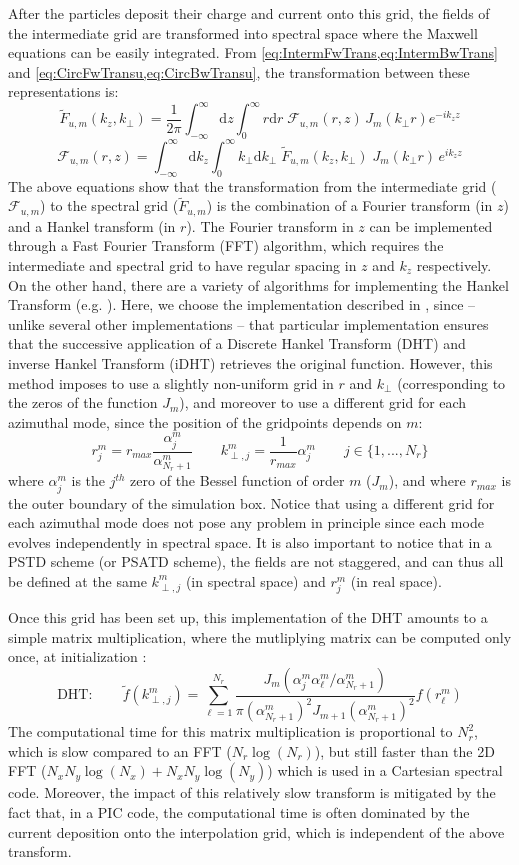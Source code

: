 \documentclass[a4paper]{article}   	%
\newcommand{\Integ}[1]{\int_{-\infty}^{\infty} \!\!\!\!\!
  \mathrm{d}#1}
\newcommand{\RInteg}[1]{\int_{0}^{\infty} \!\!\!\!\! #1\mathrm{d}#1}
\begin{document}
After the particles deposit their charge and current onto this grid,
the fields of the intermediate grid are transformed into spectral
space where the Maxwell equations can be easily integrated. From
\cref{eq:IntermFwTrans,eq:IntermBwTrans} and
\cref{eq:CircFwTransu,eq:CircBwTransu}, the transformation between these
representations is:
\[ \tilde{F}_{u,m}(k_z,k_\perp) =  \frac{1}{2\pi} \Integ{z} \RInteg{r} \;
\mathcal{F}_{u,m}(r,z) \, J_m(k_\perp r) e^{- ik_z z} \]
\[ \mathcal{F}_{u,m}(r,z) = \Integ{k_z}
\RInteg{k_\perp }\; \tilde{F}_{u,m}(k_z,k_\perp ) \; J_m(k_\perp r)\, e^{ik_z z}   \]
The above equations show that the transformation from the intermediate
grid ($\mathcal{F}_{u,m}$) to the spectral grid ($\tilde{F}_{u,m}$) is
the combination of a Fourier transform (in $z$) and a Hankel transform
(in $r$). The Fourier transform in $z$ can be implemented through a Fast Fourier
Transform (FFT) algorithm, which requires the intermediate and spectral grid to
have regular spacing in $z$ and $k_z$ respectively. On the other hand,
there are a variety of algorithms for implementing the Hankel Transform
(e.g. \cite{Cree,Siegman,Guizar}). Here, we choose the
implementation described in \cite{Guizar}, since -- unlike several other
implementations -- that particular implementation ensures that the
successive application of a Discrete Hankel Transform (DHT) and inverse Hankel Transform (iDHT)
retrieves the original function. However, this method imposes to use a
slightly non-uniform grid in $r$ and $k_\perp$ (corresponding to the
zeros of the function $J_m$), and moreover to use a
different grid for each azimuthal mode, since the position of the
gridpoints depends on $m$:
\[ r^m_j = r_{max} \frac{\alpha^m_j }{\alpha^m_{N_r+1}} \qquad
k_{\perp,j}^{m}  = \frac{1}{r_{max}} \alpha^{m}_j \qquad j \in \{1, ..., N_r \} \]
where $\alpha^{m}_j$ is the $j^{th}$ zero of the Bessel function of
order $m$ ($J_m$), and where $r_{max}$ is the outer boundary of the
simulation box. Notice that using a different grid for each azimuthal mode does
not pose any problem in principle since each mode evolves
independently in spectral space. It is also important to notice that
in a PSTD scheme (or PSATD scheme), the fields are not staggered, and
can thus all be defined at the same $k^{m}_{\perp,j}$ (in spectral
space) and $r^m_j$ (in real space).

Once this grid has been set up, this implementation of the DHT amounts
to a simple matrix multiplication, where the mutliplying matrix can be
computed only once, at initialization \cite{Guizar}:
\[ \mathrm{DHT :}\qquad  \tilde{f}(k^m_{\perp,j}) =
\sum_{\ell=1}^{N_r}
\frac{ J_{m}\left(\alpha^m_j \alpha^m_\ell /
      \alpha^m_{N_r+1}  \right) }{ \pi (\alpha^m_{N_r + 1})^2
    J_{m+1}(\alpha^m_{N_r + 1})^2 } f(r^m_\ell)\]
The computational time for this matrix multiplication is proportional
to $N_r^2$, which is slow compared to an FFT ($N_r \log(N_r)$), but
still faster than the 2D FFT ($N_x N_y \log(N_x) + N_x N_y \log(N_y) $)
which is used in a Cartesian spectral code. Moreover, the impact of
this relatively slow transform is mitigated by the fact that, in a PIC
code, the computational time is often dominated by the current deposition onto
the interpolation grid, which is independent of the above transform.
\end{document}
